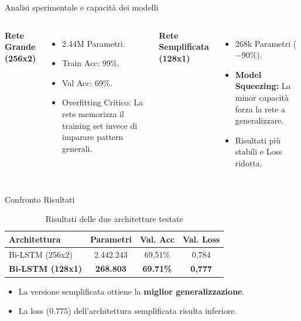 \documentclass{beamer}
\begin{document}
\begin{frame}{Analisi sperimentale e capacità dei modelli}
    \begin{columns}
        \textbf{Rete Grande (256x2)}
        \begin{itemize}
            \item 2.44M Parametri.
            \item Train Acc: 99\%.
            \item Val Acc: 69\%.
            \item \alert{Overfitting Critico:} La rete memorizza il training set invece di imparare pattern generali.
        \end{itemize}

        \textbf{Rete Semplificata (128x1)}
        \begin{itemize}
            \item 268k Parametri ($-90\%$).
            \item \textbf{Model Squeezing:} La minor capacità forza la rete a generalizzare.
            \item Risultati più stabili e Loss ridotta.
        \end{itemize}
    \end{columns}
\end{frame}

\begin{frame}{Confronto Risultati}
    \begin{table}[]
        \centering
        \begin{tabular}{|l|c|c|c|}
            \hline
            \textbf{Architettura}    & \textbf{Parametri} & \textbf{Val. Acc} & \textbf{Val. Loss} \\
            \hline
            Bi-LSTM (256x2)          & 2.442.243          & 69,51\%           & 0,784              \\
            \textbf{Bi-LSTM (128x1)} & \textbf{268.803}   & \textbf{69.71\%}  & \textbf{0,777}     \\
            \hline
        \end{tabular}
        \label{tab:results}
        \caption{Risultati delle due architetture testate}
    \end{table}
    \begin{itemize}
        \item La versione semplificata ottiene la \textbf{miglior generalizzazione}.
        \item La loss (0.775) dell'architettura semplificata risulta inferiore.
    \end{itemize}
\end{frame}
\end{document}
